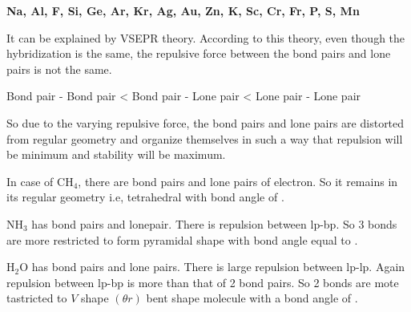 \documentclass[12pt]{article}
\begin{document}
\vspace{-0.25\baselineskip}
\begin{center}
   \textbf{Na, Al, F, Si, Ge, Ar, Kr, Ag, Au, Zn, K, Sc, Cr, Fr, P, S, Mn}
\end{center}




\pagebreak %
\vspace*{-2\baselineskip}

It can be explained by VSEPR theory. According to this theory, even though the hybridization is the same, the repulsive force between the bond pairs and lone pairs is not the same.

\begin{center}
   Bond pair - Bond pair < Bond pair - Lone pair < Lone pair - Lone pair
\end{center}

So due to the varying repulsive force, the bond pairs and lone pairs are distorted from regular geometry and organize themselves in such a way that repulsion will be minimum and stability will be maximum.

\vspace{1.2ex}
In case of $\mathrm{CH}_4$, there are  bond pairs and  lone pairs of electron. So it remains in its regular geometry i.e, tetrahedral with bond angle of .

\vspace{1.2ex}
$\mathrm{NH}_3$ has  bond pairs and  lonepair. There is repulsion between lp-bp. So 3 bonds are more restricted to form pyramidal shape with bond angle equal to .

\vspace{1.2ex}
$\mathrm{H}_2 \mathrm{O}$ has  bond pairs and  lone pairs. There is large repulsion between lp-lp. Again repulsion between lp-bp is more than that of 2 bond pairs. So 2 bonds are mote tastricted to $V$ shape $(\theta r)$ bent shape molecule with a bond angle of .


\vspace{-\baselineskip}
\begin{center}
\end{center}
\end{document}
